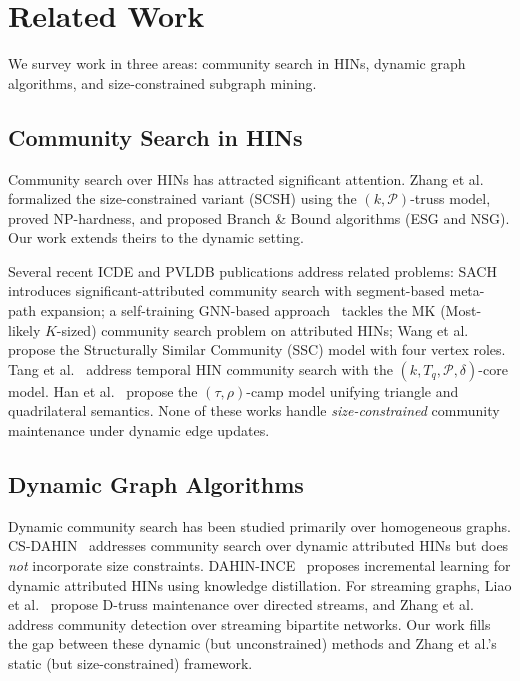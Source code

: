 \section{Related Work}

We survey work in three areas: community search in HINs, dynamic graph algorithms, and size-constrained subgraph mining.

\subsection{Community Search in HINs}

Community search over HINs has attracted significant attention. Zhang et al.~\cite{zhang2025scsh} formalized the size-constrained variant (SCSH) using the $(k,\mathcal{P})$-truss model, proved NP-hardness, and proposed Branch \& Bound algorithms (ESG and NSG). Our work extends theirs to the dynamic setting.

Several recent ICDE and PVLDB publications address related problems: SACH~\cite{sach2024icde} introduces significant-attributed community search with segment-based meta-path expansion; a self-training GNN-based approach~\cite{chen2024icde} tackles the MK (Most-likely $K$-sized) community search problem on attributed HINs; Wang et al.~\cite{wang2025pvldb} propose the Structurally Similar Community (SSC) model with four vertex roles. Tang et al.~\cite{tang2025pvldb} address temporal HIN community search with the $(k,T_q,\mathcal{P},\delta)$-core model. Han et al.~\cite{han2025vldb} propose the $(\tau,\rho)$-camp model unifying triangle and quadrilateral semantics. None of these works handle \emph{size-constrained} community maintenance under dynamic edge updates.

\subsection{Dynamic Graph Algorithms}

Dynamic community search has been studied primarily over homogeneous graphs. CS-DAHIN~\cite{song2024tkde} addresses community search over dynamic attributed HINs but does \emph{not} incorporate size constraints. DAHIN-INCE~\cite{cao2025bdsc} proposes incremental learning for dynamic attributed HINs using knowledge distillation. For streaming graphs, Liao et al.~\cite{liao2024pvldb} propose D-truss maintenance over directed streams, and Zhang et al.~\cite{zhang2024arxiv} address community detection over streaming bipartite networks. Our work fills the gap between these dynamic (but unconstrained) methods and Zhang et al.'s static (but size-constrained) framework.

